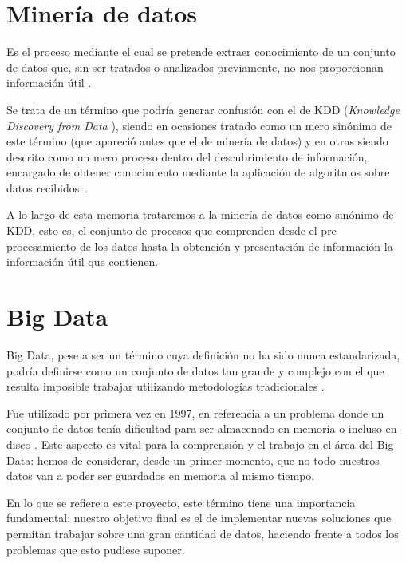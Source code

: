 

\section{Minería de datos}\label{DefMineria}

Es el proceso mediante el cual se pretende extraer conocimiento de un conjunto de datos que, sin ser tratados o analizados previamente, no nos proporcionan información útil \cite{DataMiningConcepts}.

Se trata de un término que podría generar confusión con el de KDD (\textit{Knowledge Discovery from Data} \cite{fayyad1996data}), siendo en ocasiones tratado como un mero sinónimo de este término (que apareció antes que el de minería de datos) y en otras siendo descrito como un mero proceso dentro del descubrimiento de información, encargado de obtener conocimiento mediante la aplicación de algoritmos sobre datos recibidos~\cite{DataMiningConcepts}. 

A lo largo de esta memoria trataremos a la minería de datos como sinónimo de KDD, esto es, el conjunto de procesos que comprenden desde el pre procesamiento de los datos hasta la obtención y presentación de información la información útil que contienen.

\section{Big Data}\label{sec:defBigData}

Big Data, pese a ser un término cuya definición no ha sido nunca estandarizada, podría definirse como un conjunto de datos tan grande y complejo con el que resulta imposible trabajar utilizando metodologías tradicionales \cite{bigDataDef}.

Fue utilizado por primera vez en 1997, en referencia a un problema donde un conjunto de datos tenía dificultad para ser almacenado en memoria o incluso en disco \cite{forbesBigData}\cite{cox1997application}. Este aspecto es vital para la comprensión y el trabajo en el área del Big Data: hemos de considerar, desde un primer momento, que no todo nuestros datos van a poder ser guardados en memoria al mismo tiempo.

En lo que se refiere a este proyecto, este término tiene una importancia fundamental: nuestro objetivo final es el de implementar nuevas soluciones que permitan trabajar sobre una gran cantidad de datos, haciendo frente a todos los problemas que esto pudiese suponer.

